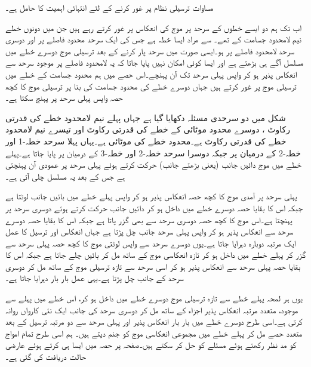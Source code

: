 مساوات  ترسیلی نظام پر غور کرنے کے لئے انتہائی اہمیت کا حامل ہے۔

اب تک ہم دو ایسے خطوں کے سرحد پر موج کی انعکاس پر غور کرتے رہے ہیں جن میں دونوں خطے نیم لامحدود جسامت کے تھے۔ سے مراد ایسا خطہ ہے جس کی ایک سرحد محدود فاصلے پر اور دوسری سرحد لامحدود فاصلے پر ہو۔ایسی صورت میں سرحد پار کرنے کے بعد ترسیلی موج دوسرے خطے میں مسلسل آگے ہی بڑھتے ہے اور ایسا کوئی امکان نہیں پایا جاتا کہ یہ لامحدود فاصلے پر موجود  سرحد سے انعکاس پذیر ہو کر واپس پہلی سرحد تک آن پہنچے۔اس حصے میں ہم محدود جسامت کے خطے میں ترسیلی موج پر غور کرتے ہیں جہاں دوسرے خطے کی محدود جسامت کی بنا پر ترسیلی موج کا کچھ حصہ واپس پہلی سرحد پر پہنچ سکتا ہے۔

شکل  میں دو سرحدی مسئلہ دکھایا گیا ہے جہاں پہلے نیم لامحدود خطے کی قدرتی رکاوٹ ، دوسرے محدود موٹائی کے خطے کی قدرتی رکاوٹ  اور تیسرے نیم لامحدود خطے کی قدرتی رکاوٹ  ہے۔محدود خطے کی موٹائی  ہے۔یہاں پہلا سرحد خطہ-1 اور خطہ-2 کے درمیان  پر جبکہ دوسرا سرحد خطہ-2 اور خطہ-3 کے درمیان  پر پایا جاتا ہے۔پہلے خطے میں موج دائیں جانب (یعنی بڑھتے  جانب) حرکت کرتے ہوئے پہلی سرحد پر عمودی آن پہنچتی ہے جس کے بعد یہ مسلسل چلی آتی ہے۔

پہلی سرحد پر آمدی موج کا کچھ حصہ انعکاس پذیر ہو کر واپس پہلے خطے میں بائیں جانب لوٹتا ہے جبکہ اس کا بقایا حصہ دوسرے خطے میں داخل ہو کر دائیں جانب حرکت کرتے ہوئے دوسری سرحد پر پہنچتا ہے۔اس موج کا کچھ حصہ دوسری سرحد سے بھی گزر پاتا ہے جبکہ اس کا بقایا حصہ دوسرے سرحد سے انعکاس پذیر ہو کر واپس پہلی سرحد جانب چل پڑتا ہے جہاں انعکاس اور ترسیل کا عمل ایک مرتبہ دوبارہ دہرایا جاتا ہے۔یوں دوسرے سرحد سے واپس لوٹتی موج کا کچھ حصہ پہلی سرحد سے گزر کر پہلے خطے میں داخل ہو کر تازہ انعکاسی موج کے ساتھ مل کر بائیں چلے جاتا ہے جبکہ اس کا بقایا حصہ پہلی سرحد سے انعکاس پذیر ہو کر اسی سرحد سے تازہ ترسیلی موج کے ساتھ مل کر  دوسری سرحد کے جانب چل پڑتا ہے۔یہی عمل بار بار دہرایا جاتا ہے۔

یوں ہر لمحہ پہلے خطے سے تازہ ترسیلی موج دوسرے خطے میں داخل ہو کر، اس خطے میں پہلے سے موجود، متعدد مرتبہ انعکاس پذیر اجزاء کے ساتھ مل کر دوسری سرحد کی جانب ایک نئی کارواں روانہ کرتی ہے۔اسی طرح دوسرے خطے میں بار بار انعکاس پذیر اور پہلی سرحد سے دو مرتبہ ترسیل کے بعد متعدد حصے مل کر پہلے خطے میں مجموعی انعکاسی موج کو جنم دیتے ہیں۔  
ہم اسی طرح تمام امواج کو مد نظر رکھتے ہوئے مسئلے کو حل کر سکتے ہیں۔صفحہ  پر حصہ  میں ایسا ہی کرتے ہوئے عارضی حالت دریافت کی گئی ہے۔

